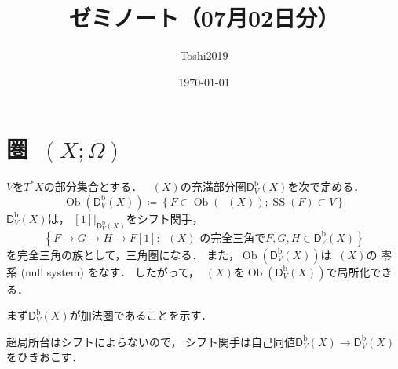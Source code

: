 \documentclass[leqno, 10pt, a4paper, dvipdfmx]{jsarticle}
\title{ゼミノート（07月02日分）}
\author{Toshi2019}
\date{\today}
\makeatletter
\theoremstyle{definition}
\renewenvironment{proof}[1][\proofname]{\par
  \pushQED{\qed}%
  \normalfont \topsep6\p@\@plus6\p@\relax
  \trivlist
  \item[\hskip\labelsep
         \bfseries
    {#1}]\ignorespaces
}{%
  \popQED\endtrivlist\@endpefalse
}
\renewcommand{\proofname}{証明.}
\numberwithin{equation}{section}
\newcommand{\Ob}{\mathop{\textrm{Ob}}\nolimits}
\newcommand{\Dompb}{\mathop{\mathsf{D}^\mathrm{b}}\nolimits}
\newcommand{\muS}{\mathop{\mathrm{SS}}\nolimits}
\newcommand{\mres}[2][]{{\left.{#1}\right\rvert}_{#2}}
\theoremstyle{mystyle}
\newcommand{\cotb}[1][]{T^{\ast}{#1}}
\newcommand{\mucat}[2][]{\mathsf{D}^{\mathrm{b}}_{#1}(#2)}
\makeatother
\begin{document}
\maketitle
\tableofcontents
\section{圏\(\Dompb(X;\varOmega)\)}

\(V\)を\(\cotb[X]\)の部分集合とする．
\(\Dompb(X)\)の充満部分圏\(\mucat[V]{X}\)を次で定める．
\begin{equation}\label{eq:6.1.1}
    \Ob(\mucat[V]{X})\coloneqq
    \left\{F\in\Ob(\Dompb(X));\muS(F)\subset V\right\}
\end{equation}
\(\mucat[V]{X}\)は，
\(\mres[{[1]}]{\mucat[V]{X}}\)をシフト関手，
\[
    \left\{F\to G\to H\to F[1]\mathrel{;}\text{\(\Dompb(X)\) の完全三角で} F,G,H\in\mucat[V]{X}\right\}
\]
を完全三角の族として，三角圏になる．
また，\(\Ob(\mucat[V]{X})\)は\(\Dompb(X)\)の
零系 (null system) をなす．
したがって，\(\Dompb(X)\)を\(\Ob(\mucat[V]{X})\)で局所化できる．

\begin{proof}[{\(\mucat[V]{X}\)が三角圏になることの証明．}]
    まず\(\mucat[V]{X}\)が加法圏であることを示す．

    超局所台はシフトによらないので，
    シフト関手は自己同値\(\mucat[V]{X}\to\mucat[V]{X}\)をひきおこす．
\end{proof}























\end{document}
